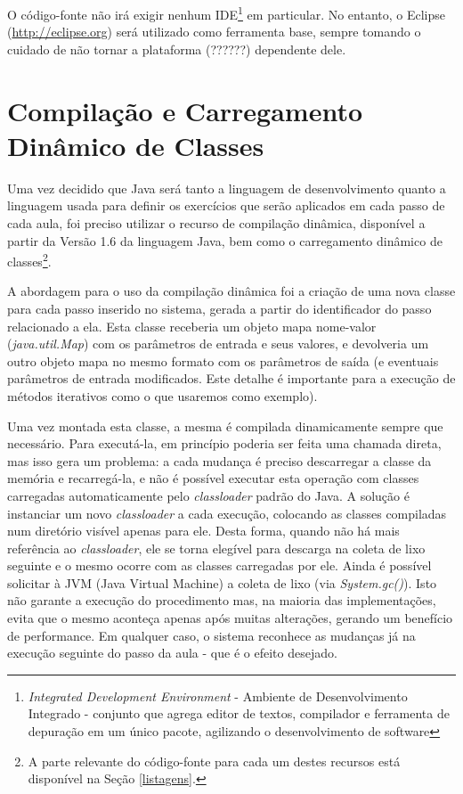 \documentclass{abnt}
\begin{document}
	O código-fonte não irá exigir nenhum IDE\footnote{\textit{Integrated Development Environment} - Ambiente de Desenvolvimento Integrado - conjunto que agrega editor de textos, compilador e ferramenta de depuração em um único pacote, agilizando o desenvolvimento de software} em particular. No entanto, o Eclipse (\url{http://eclipse.org}) será utilizado como ferramenta base, sempre tomando o cuidado de não tornar a plataforma (??????)  dependente dele. 

\section{Compilação e Carregamento Dinâmico de Classes}
\label{explicacao_compilacao}

	Uma vez decidido que Java será tanto a linguagem de desenvolvimento quanto a linguagem usada para definir os exercícios que serão aplicados em cada passo de cada aula, foi preciso utilizar o recurso de compilação dinâmica, disponível a partir da Versão 1.6 da linguagem Java, bem como o carregamento dinâmico de classes\footnote{A parte relevante do código-fonte para cada um destes recursos está disponível na Seção \ref{listagens}.}.

	A abordagem para o uso da compilação dinâmica foi a criação de uma nova classe para cada passo inserido no sistema, gerada a partir do identificador do passo relacionado a ela. Esta classe receberia um objeto mapa nome-valor (\textit{java.util.Map}) com os parâmetros de entrada e seus valores, e devolveria um outro objeto mapa no mesmo formato com os parâmetros de saída (e eventuais parâmetros de entrada modificados.  Este detalhe é importante para a execução de métodos iterativos como o que usaremos como exemplo).

	Uma vez montada esta classe, a mesma é compilada dinamicamente sempre que necessário. Para executá-la, em princípio poderia ser feita uma chamada direta, mas isso gera um problema: a cada mudança é preciso descarregar a classe da memória e recarregá-la, e não é possível executar esta operação com classes carregadas automaticamente pelo \textit{classloader} padrão do Java. A solução é instanciar um novo \textit{classloader} a cada execução, colocando as classes compiladas num diretório visível apenas para ele. Desta forma, quando não há mais referência ao \textit{classloader}, ele se torna elegível para descarga na coleta de lixo seguinte e o mesmo ocorre com as classes carregadas por ele. Ainda é possível solicitar à JVM (Java Virtual Machine) a coleta de lixo (via \textit{System.gc()}). Isto não garante a execução do procedimento mas, na maioria das implementações, evita que o mesmo aconteça apenas após muitas alterações, gerando um benefício de performance. Em qualquer caso, o sistema reconhece as mudanças já na execução seguinte do passo da aula - que é o efeito desejado.
\end{document}
